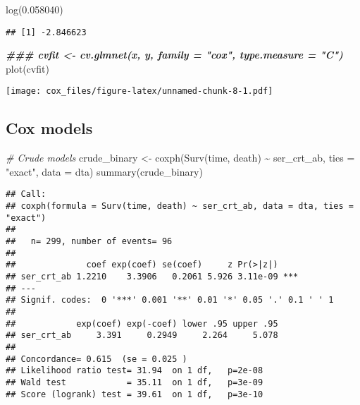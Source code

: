 \documentclass[
]{article}
\newenvironment{Shaded}{\begin{snugshade}}{\end{snugshade}}
\newcommand{\AttributeTok}[1]{\textcolor[rgb]{0.77,0.63,0.00}{#1}}
\newcommand{\CommentTok}[1]{\textcolor[rgb]{0.56,0.35,0.01}{\textit{#1}}}
\newcommand{\DocumentationTok}[1]{\textcolor[rgb]{0.56,0.35,0.01}{\textbf{\textit{#1}}}}
\newcommand{\FloatTok}[1]{\textcolor[rgb]{0.00,0.00,0.81}{#1}}
\newcommand{\FunctionTok}[1]{\textcolor[rgb]{0.00,0.00,0.00}{#1}}
\newcommand{\NormalTok}[1]{#1}
\newcommand{\OtherTok}[1]{\textcolor[rgb]{0.56,0.35,0.01}{#1}}
\newcommand{\SpecialCharTok}[1]{\textcolor[rgb]{0.00,0.00,0.00}{#1}}
\newcommand{\StringTok}[1]{\textcolor[rgb]{0.31,0.60,0.02}{#1}}
\begin{document}
\begin{Shaded}
\begin{Highlighting}[]
\FunctionTok{log}\NormalTok{(}\FloatTok{0.058040}\NormalTok{)}
\end{Highlighting}
\end{Shaded}

\begin{verbatim}
## [1] -2.846623
\end{verbatim}

\begin{Shaded}
\begin{Highlighting}[]
\DocumentationTok{\#\#\# cvfit \textless{}{-} cv.glmnet(x, y, family = "cox", type.measure = "C")}
\FunctionTok{plot}\NormalTok{(cvfit)}
\end{Highlighting}
\end{Shaded}

\texttt{[image: cox\_files/figure-latex/unnamed-chunk-8-1.pdf]}

\hypertarget{cox-models}{%
\subsection{Cox models}\label{cox-models}}

\begin{Shaded}
\begin{Highlighting}[]
\CommentTok{\# Crude models}
\NormalTok{crude\_binary }\OtherTok{\textless{}{-}} \FunctionTok{coxph}\NormalTok{(}\FunctionTok{Surv}\NormalTok{(time, death) }\SpecialCharTok{\textasciitilde{}}\NormalTok{ ser\_crt\_ab, }\AttributeTok{ties =} \StringTok{"exact"}\NormalTok{, }\AttributeTok{data =}\NormalTok{ dta)}
\FunctionTok{summary}\NormalTok{(crude\_binary)}
\end{Highlighting}
\end{Shaded}

\begin{verbatim}
## Call:
## coxph(formula = Surv(time, death) ~ ser_crt_ab, data = dta, ties = "exact")
## 
##   n= 299, number of events= 96 
## 
##              coef exp(coef) se(coef)     z Pr(>|z|)    
## ser_crt_ab 1.2210    3.3906   0.2061 5.926 3.11e-09 ***
## ---
## Signif. codes:  0 '***' 0.001 '**' 0.01 '*' 0.05 '.' 0.1 ' ' 1
## 
##            exp(coef) exp(-coef) lower .95 upper .95
## ser_crt_ab     3.391     0.2949     2.264     5.078
## 
## Concordance= 0.615  (se = 0.025 )
## Likelihood ratio test= 31.94  on 1 df,   p=2e-08
## Wald test            = 35.11  on 1 df,   p=3e-09
## Score (logrank) test = 39.61  on 1 df,   p=3e-10
\end{verbatim}
\end{document}
